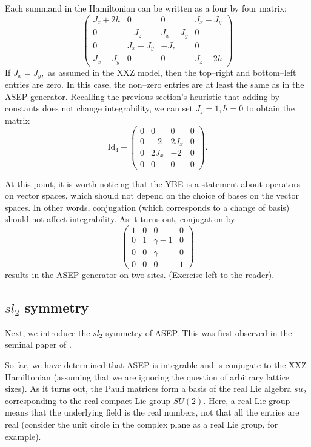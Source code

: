 \documentclass{ximera}
\begin{document}
Each summand in the Hamiltonian can be written as a four by four matrix:
\[
\left(\begin{array}{cccc}
J_z + 2h & 0 & 0 & J_x-J_y \\
0 & -J_z & J_x + J_y & 0 \\
0 & J_x + J_y & -J_z & 0 \\
J_x - J_y & 0 & 0 & J_z-2h
\end{array}\right)
\]
If \(J_x=J_y,\) as assumed in the XXZ model, then the top--right and bottom--left entries are zero. In 
this case, the non--zero entries are at least the same as in the ASEP generator. Recalling the previous
section's heuristic that adding by constants does not change integrability, we can set \(J_z=1,h=0\) to
obtain the matrix
\[
\mathrm{Id}_4 + \left( \begin{array}{cccc}
0 & 0 & 0 & 0 \\
0 & -2 & 2J_x & 0 \\
0 & 2J_x & -2 & 0\\
0 & 0 & 0 & 0 
\end{array}\right).
\]

At this point, it is worth noticing that the YBE is a statement about operators on vector spaces, 
which should not depend on the choice of bases on the vector spaces. In other words, conjugation 
(which corresponds to a change of basis) should not affect integrability. As it turns out, conjugation by 
\[
\left( \begin{array}{cccc}
1 & 0 & 0 & 0 \\
0 & 1 & \gamma-1 & 0 \\
0 & 0 & \gamma & 0 \\
0 & 0 & 0 & 1
\end{array} \right)
\]
results in the ASEP generator on two sites. (Exercise left to the reader).



\subsection{\(sl_2\) symmetry}
Next, we introduce the \(sl_2\) symmetry of ASEP. This was first observed in the seminal paper of \cite{Sch97}. 

So far, we have determined that ASEP is integrable and is conjugate to the XXZ Hamiltonian
(assuming that we are ignoring the question of arbitrary lattice sizes). As it turns out, the
Pauli matrices form a basis of the real Lie algebra \(su_2\) corresponding to the real compact Lie group 
\(SU(2).\) Here, a real Lie group means that the underlying field is the real numbers, not that
all the entries are real (consider the unit circle in the complex plane as a real Lie group, for example).
\end{document}
